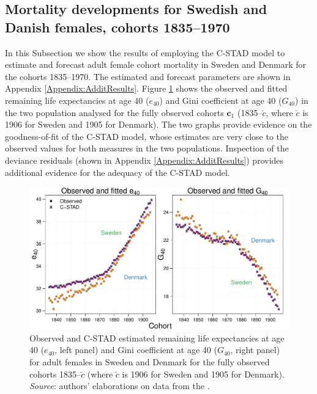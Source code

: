 \documentclass[11pt, a4paper]{article}
\begin{document}
\subsection{Mortality developments for Swedish and Danish females, cohorts 1835--1970}
\label{Subsec:ForecastC-STAD}
In this Subsection we show the results of employing the C-STAD model to estimate and forecast adult female cohort mortality in Sweden and Denmark for the cohorts 1835--1970. The estimated and forecast parameters are shown in Appendix \ref{Appendix:AdditResults}. Figure \ref{Fig:CSTADfitE40G40} shows the observed and fitted remaining life expectancies at age 40 ($e_{40}$) and Gini coefficient at age 40 ($G_{40}$) in the two population analysed for the fully observed cohorts $\bm{c}_1$ (1835--$\breve{c}$, where $\breve{c}$ is 1906 for Sweden and 1905 for Denmark). The two graphs provide evidence on the goodness-of-fit of the C-STAD model, whose estimates are very close to the observed values for both measures in the two populations. Inspection of the deviance residuals (shown in Appendix \ref{Appendix:AdditResults}) provides additional evidence for the adequacy of the C-STAD model.

\begin{figure}[t]
	\begin{center}
		\includegraphics[scale=0.57]{./Figures/F5.pdf} 
		\caption{Observed and C-STAD estimated remaining life expectancies at age 40 ($e_{40}$, left panel) and Gini coefficient at age 40 ($G_{40}$, right panel) for adult females in Sweden and Denmark for the fully observed cohorts 1835--$\breve{c}$ (where $\breve{c}$ is 1906 for Sweden and 1905 for Denmark).\\ \small \textit{Source}: authors' elaborations on data from the \cite{HMD}.\label{Fig:CSTADfitE40G40}}    
	\end{center}
\end{figure}
\end{document}
